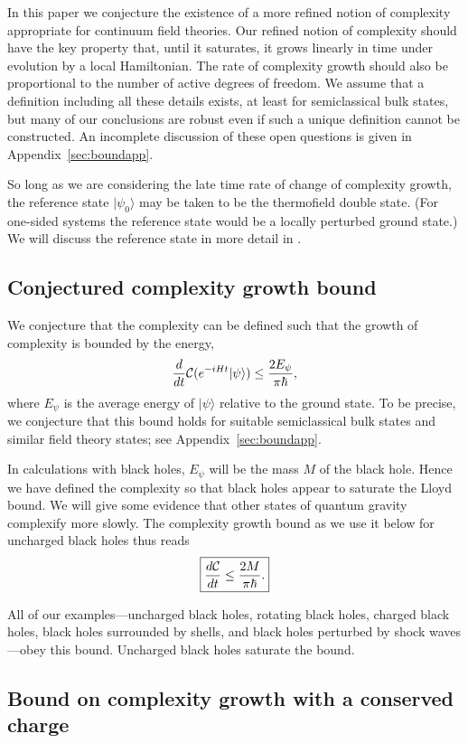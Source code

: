 \documentclass[12pt]{article}
\numberwithin{equation}{section}
\newcommand{\beq}{\begin{equation}}
\newcommand{\eeq}{\end{equation}}
\def\CC{{\cal C}}
\newcommand{\ket}[1]{| #1 \rangle }
\begin{document}
In this paper we conjecture the existence of a more refined notion of complexity appropriate for continuum field theories. Our refined notion of complexity should have the key property that, until it saturates, it grows linearly in time under evolution by a local Hamiltonian. The rate of complexity growth should also be proportional to the number of active degrees of freedom. We assume that a definition including all these details exists, at least for semiclassical bulk states, but many of our conclusions are robust even if such a unique definition cannot be constructed. An incomplete discussion of these open questions is given in Appendix~\ref{sec:boundapp}.

So long as we are considering the late time rate of change of complexity growth, the reference state $\ket{\psi_0}$ may be taken to be the thermofield double state. (For one-sided systems the reference state would be a locally perturbed ground state.) We will discuss the reference state in more detail in \cite{ToAppear}.

\subsection{Conjectured complexity growth bound}

We conjecture that the complexity can be defined such that the growth of complexity is bounded by the energy,
\beq
\label{eq:bound}
\frac{d}{dt} \CC( e^{-i H t}\ket{\psi}) \leq \frac{2 E_\psi}{\pi \hbar},
\eeq
where $E_\psi$ is the average energy of $\ket{\psi}$ relative to the ground state. To be precise, we conjecture that this bound holds for suitable semiclassical bulk states and similar field theory states; see Appendix~\ref{sec:boundapp}.

In calculations with black holes, $E_\psi$ will be the mass $M$ of the black hole. Hence we have defined the complexity so that black holes appear to saturate the Lloyd bound. We will give some evidence that other states of quantum gravity complexify more slowly. The complexity growth bound as we use it below for uncharged black holes thus reads
\beq
\boxed{\frac{d{\CC}}{dt} \leq  \frac{2M}{\pi\hbar}.}
\label{C-bound}
\eeq

All of our examples---uncharged black holes, rotating black holes, charged black holes, black holes surrounded by shells, and black holes perturbed by shock waves---obey this bound. Uncharged black holes saturate the bound.


\subsection{Bound on complexity growth with a conserved charge}\label{sec:conserved-charge}
\end{document}
